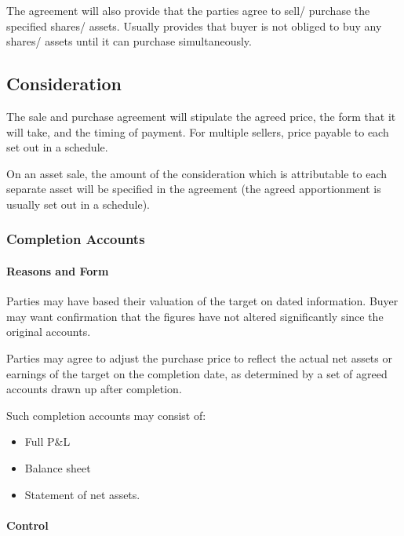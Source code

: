 \documentclass[
]{article}
\providecommand{\tightlist}{%
  \setlength{\itemsep}{0pt}\setlength{\parskip}{0pt}}
\begin{document}
The agreement will also provide that the parties agree to sell/ purchase
the specified shares/ assets. Usually provides that buyer is not obliged
to buy any shares/ assets until it can purchase simultaneously.

\hypertarget{consideration}{%
\subsection{Consideration}\label{consideration}}

The sale and purchase agreement will stipulate the agreed price, the
form that it will take, and the timing of payment. For multiple sellers,
price payable to each set out in a schedule.

On an asset sale, the amount of the consideration which is attributable
to each separate asset will be specified in the agreement (the agreed
apportionment is usually set out in a schedule).

\hypertarget{completion-accounts}{%
\subsubsection{Completion Accounts}\label{completion-accounts}}

\hypertarget{reasons-and-form}{%
\paragraph{Reasons and Form}\label{reasons-and-form}}

Parties may have based their valuation of the target on dated
information. Buyer may want confirmation that the figures have not
altered significantly since the original accounts.

Parties may agree to adjust the purchase price to reflect the actual net
assets or earnings of the target on the completion date, as determined
by a set of agreed accounts drawn up after completion.

Such completion accounts may consist of:

\begin{itemize}
\tightlist
\item
  Full P\&L
\item
  Balance sheet
\item
  Statement of net assets.
\end{itemize}

\hypertarget{control}{%
\paragraph{Control}\label{control}}
\end{document}

